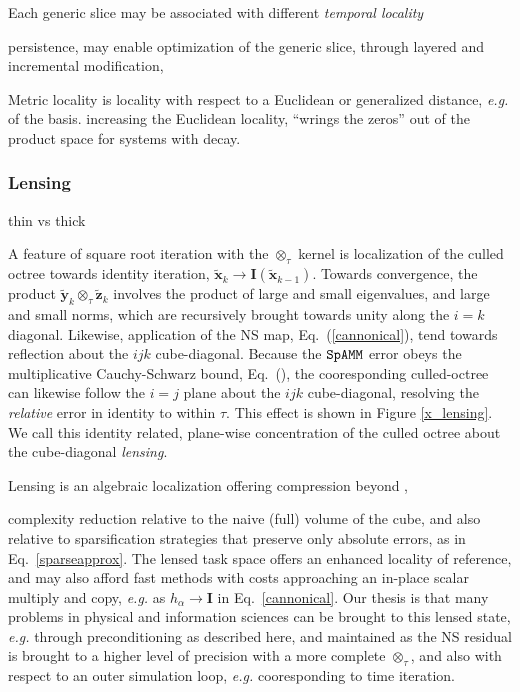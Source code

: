 \documentclass[letterpaper,twocolumn,amsmath,amsfont,amssymb,english,aps,jcp,preprintnumbers,groupaddress,nofootinbib,tightenlines,floatfix]{revtex4}
\newcommand{\mat}[1]{\boldsymbol{#1}}
\newcommand{\ot}{  {\scriptstyle \otimes}_{ \tau } }
\theoremstyle{plain}
\theoremstyle{remark}
\theoremstyle{plain}
\begin{document}
Each generic slice may be associated with different {\em temporal locality}

persistence, may enable optimization of the generic slice, through layered and incremental modification, 

Metric locality is locality with respect to a Euclidean or generalized distance, {\em e.g.} of the basis.  
increasing the Euclidean locality, ``wrings the zeros'' out of the product space for systems with decay.


\subsubsection{Lensing}

thin vs thick

A feature of square root iteration with the $\ot$ kernel is localization of the culled octree towards identity iteration, 
$\widetilde{\mat{x}}_k \rightarrow \mat{I}\left( \widetilde{\mat{x}}_{k-1} \right)$.  Towards convergence,  
the product $\widetilde{\mat{y}}_k \ot \widetilde{\mat{z}}_k$ involves the product of large and small eigenvalues, and large and small norms, 
which are recursively brought towards unity along the $i=k$ diagonal.  Likewise, application of the NS map, Eq.~(\ref{cannonical}),  tend towards 
reflection about the $ijk$ cube-diagonal.   Because the $\tt SpAMM$ error obeys the multiplicative Cauchy-Schwarz bound, Eq.~(),  the 
cooresponding culled-octree can likewise follow the $i=j$ plane about the $ijk$ cube-diagonal, resolving the {\em relative} error in identity to within $\tau$.    This effect is shown in Figure \ref{x_lensing}.   
We call this identity related,  plane-wise concentration of the culled octree  about the cube-diagonal {\em lensing}.  

Lensing is an algebraic localization offering compression beyond  , 

complexity reduction relative to the naive (full) volume of the cube,
and also relative to sparsification strategies that preserve only absolute errors, as in Eq.~\ref{sparseapprox}.  
The lensed task space offers an enhanced locality of reference, and may also afford fast methods 
with costs approaching an in-place scalar multiply and copy, {\em e.g.} as $h_\alpha \rightarrow \mat{I}$ in Eq.~\ref{cannonical}.
Our thesis is that many problems in physical and information sciences can be brought to this lensed state, {\em e.g.} through preconditioning
as described here, and maintained as the NS residual is brought to a higher level of precision with a more complete $\ot$, 
and also with respect to an outer simulation loop, {\em e.g.} cooresponding to time iteration.
\end{document}
